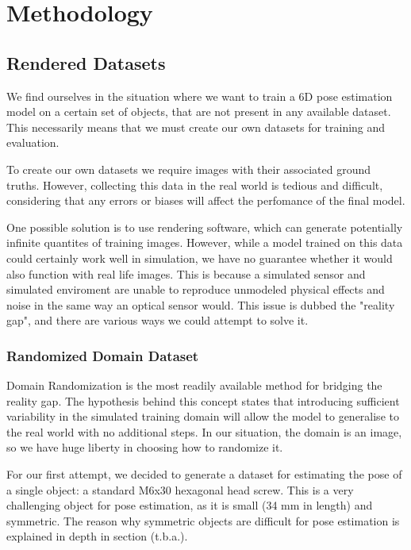 \chapter{Methodology}

\section{Rendered Datasets}

We find ourselves in the situation where we want to train a 6D pose estimation model on a certain set of objects, that are not present in any available dataset. This necessarily means that we must create our own datasets for training and evaluation.

To create our own datasets we require images with their associated ground truths. However, collecting this data in the real world is tedious and difficult, considering that any errors or biases will affect the perfomance of the final model. 

One possible solution is to use rendering software, which can generate potentially infinite quantites of training images. However, while a model trained on this data could certainly work well in simulation, we have no guarantee whether it would also function with real life images. This is because a simulated sensor and simulated enviroment are unable to reproduce unmodeled physical effects and noise in the same way an optical sensor would. This issue is dubbed the "reality gap"\cite{domainRandomization2}, and there are various ways we could attempt to solve it.

\subsection{Randomized Domain Dataset}

Domain Randomization\cite{domainRandomization} is the most readily available method for bridging the reality gap. The hypothesis behind this concept states that introducing sufficient variability in the simulated training domain will allow the model to generalise to the real world with no additional steps. In our situation, the domain is an image, so we have huge liberty in choosing how to randomize it.

For our first attempt, we decided to generate a dataset for estimating the pose of a single object: a standard M6x30 hexagonal head screw. This is a very challenging object for pose estimation, as it is small (34 mm in length) and symmetric. The reason why symmetric objects are difficult for pose estimation is explained in depth in section (t.b.a.).

